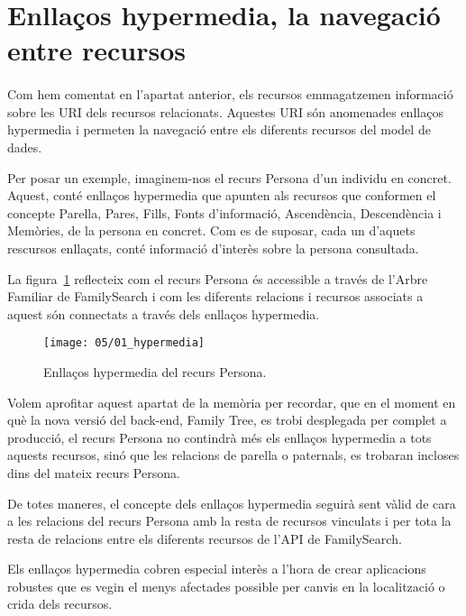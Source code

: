 \section{Enllaços hypermedia, la navegació entre recursos}

    \paragraph{}
    Com hem comentat en l’apartat anterior, els recursos emmagatzemen informació sobre les URI dels recursos relacionats. Aquestes URI són anomenades enllaços hypermedia i permeten la navegació  entre els diferents recursos del model de dades.

    Per posar un exemple, imaginem-nos el recurs Persona d'un individu en concret. Aquest, conté enllaços hypermedia que apunten als recursos que conformen el concepte Parella, Pares, Fills, Fonts d'informació, Ascendència, Descendència i Memòries, de la persona en concret. Com es de suposar, cada un d'aquets rescursos enllaçats, conté informació d'interès sobre la persona consultada.

    La figura~\ref{fig:hypermedia} reflecteix com el recurs Persona és accessible a través de l'Arbre Familiar de FamilySearch i com les diferents relacions i recursos associats a aquest són connectats a través dels enllaços hypermedia.

    \begin{figure}[h]
        \texttt{[image: 05/01\_hypermedia]}
        \centering
        \caption{Enllaços hypermedia del recurs Persona.}\label{fig:hypermedia}
    \end{figure}

    Volem aprofitar aquest apartat de la memòria per recordar, que en el moment en què la nova versió del back-end, Family Tree, es trobi desplegada per complet a producció, el recurs Persona no contindrà més els enllaços hypermedia a tots aquests recursos, sinó que les relacions de parella o paternals, es trobaran incloses dins del mateix recurs Persona.

    De totes maneres, el concepte dels enllaços hypermedia seguirà sent vàlid de cara a les relacions del recurs Persona amb la resta de recursos vinculats i per tota la resta de relacions entre els diferents recursos de l'API de FamilySearch.

    Els enllaços hypermedia cobren especial interès a l'hora de crear aplicacions robustes que es vegin el menys afectades possible per canvis en la localització o crida dels recursos.

